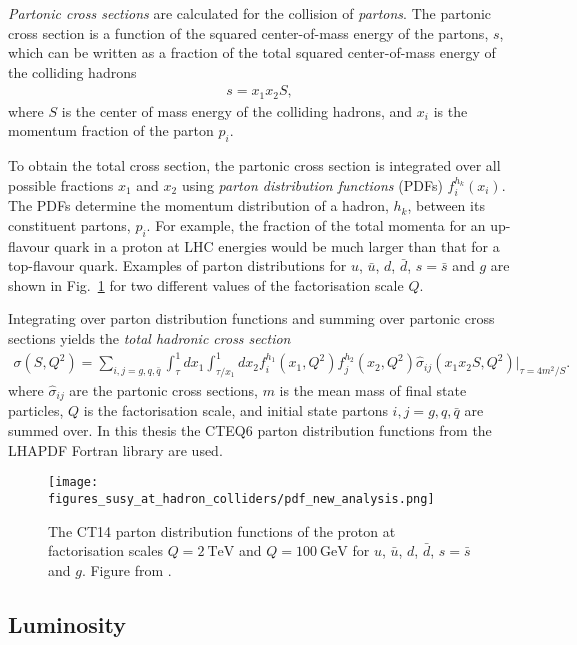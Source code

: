 \documentclass[twoside,english]{uiofysmaster}
\begin{document}
{\textit{Partonic cross sections} are calculated for the collision of \textit{partons}. The partonic cross section is a function of the squared center-of-mass energy of the partons, $s$, which can be written as a fraction of the total squared center-of-mass energy of the colliding hadrons
\begin{align}
s = x_1 x_2 S,
\end{align}
where $S$ is the center of mass energy of the colliding hadrons, and $x_i$ is the momentum fraction of the parton $p_i$. 

To obtain the total cross section, the partonic cross section is integrated over all possible fractions $x_1$ and $x_2$ using \textit{parton distribution functions} (PDFs) $f_i^{h_k}(x_i)$. The PDFs determine the momentum distribution of a hadron, $h_k$, between its constituent partons, $p_i$. For example, the fraction of the total momenta for an up-flavour quark in a proton at LHC energies would be much larger than that for a top-flavour quark. Examples of parton distributions for $u$, $\bar{u}$, $d$, $\bar{d}$, $s=\bar{s}$ and $g$ are shown in Fig.~\ref{Fig:: susy hadron : PDFs} for two different values of the factorisation scale $Q$. 

Integrating over parton distribution functions and summing over partonic cross sections yields the \textit{total hadronic cross section}
\begin{align}
\sigma(S, Q^2) = \sum_{i,j=g, q, \bar{q}} \int_{\tau}^1dx_1 \int_{\tau/x_1}^1 dx_2 f_i^{h_1} (x_1, Q^2) f_j^{h_2}(x_2, Q^2) \hat{\sigma}_{ij} (x_1x_2S, Q^2)\Big|_{\tau=4m^2/S}.
\end{align}
where $\hat{\sigma}_{ij}$ are the partonic cross sections, $m$ is the mean mass of final state particles, $Q$ is the factorisation scale, and initial state partons $i,j=g,q, \bar{q}$ are summed over.  In this thesis the CTEQ6 parton distribution functions from the LHAPDF Fortran library \cite{Nadolsky:2008zw} are used. 

\begin{figure}
\centering
\texttt{[image: figures\_susy\_at\_hadron\_colliders/pdf\_new\_analysis.png]}
\caption{The CT14 parton distribution functions of the proton at factorisation scales $Q=2~\mathrm{TeV}$ and $Q=100~\mathrm{GeV}$ for $u$, $\bar{u}$, $d$, $\bar{d}$, $s=\bar{s}$ and $g$.  Figure from \cite{Dulat:2015mca}.}
\label{Fig:: susy hadron : PDFs}
\end{figure}




\subsection{Luminosity}

}
\end{document}

